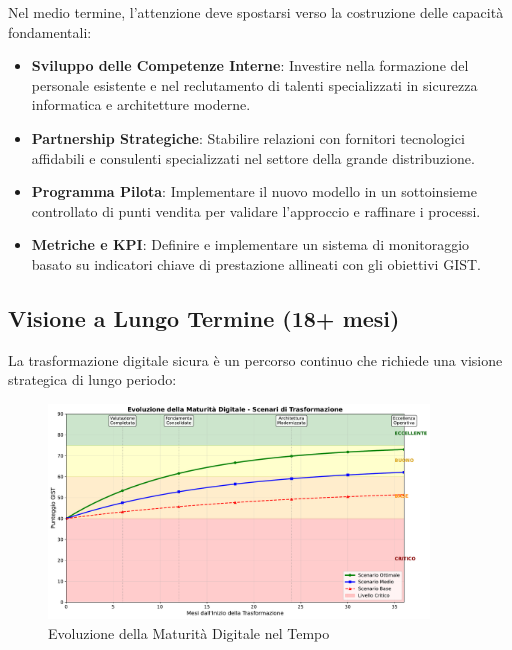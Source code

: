 Nel medio termine, l'attenzione deve spostarsi verso la costruzione delle capacità fondamentali:

\begin{itemize}
\item \textbf{Sviluppo delle Competenze Interne}: Investire nella formazione del personale esistente e nel reclutamento di talenti specializzati in sicurezza informatica e architetture moderne.

\item \textbf{Partnership Strategiche}: Stabilire relazioni con fornitori tecnologici affidabili e consulenti specializzati nel settore della grande distribuzione.

\item \textbf{Programma Pilota}: Implementare il nuovo modello in un sottoinsieme controllato di punti vendita per validare l'approccio e raffinare i processi.

\item \textbf{Metriche e KPI}: Definire e implementare un sistema di monitoraggio basato su indicatori chiave di prestazione allineati con gli obiettivi GIST.
\end{itemize}

\subsection{Visione a Lungo Termine (18+ mesi)}
\label{subsec:5.7.3}

La trasformazione digitale sicura è un percorso continuo che richiede una visione strategica di lungo periodo:

\begin{figure}[htbp]
\centering
\includegraphics[width=0.9\textwidth]{thesis_figures/cap5/maturity_evolution.pdf}
\caption{Evoluzione della Maturità Digitale nel Tempo}
\label{fig:maturity_evolution}
\end{figure}

